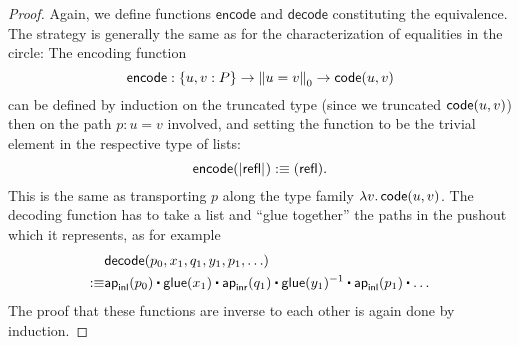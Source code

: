 \begin{proof}
Again, we define functions $\mathsf{encode}$ and $\mathsf{decode}$ constituting
the equivalence.
The strategy is generally the same as for the characterization of equalities
in the circle:
The encoding function
\begin{equation*}
\mathsf{encode} : \{u, v : P\} \to \trunc{0}{u = v} \to \code(u, v)
\end{equation*}
can be defined by induction on the truncated type (since we truncated $\code(u,v)$)
then on the path $p : u = v$ involved, and setting the function to be the trivial
element in the respective type of lists:
\begin{equation*}
\mathsf{encode}(\tproj{}{\refl}) :\equiv (\refl) \text{.}
\end{equation*}
This is the same as transporting $p$ along the type family $\lambda v.\, \code(u,v)$.
The decoding function has to take a list and ``glue together'' the paths in the
pushout which it represents, as for example
\begin{align*}
 & \mathsf{decode} (p_0, x_1, q_1, y_1, p_1, \ldots) \\
:\equiv & \ap_\inl(p_0) \ct \glue(x_1) \ct \ap_\inr(q_1) \ct \glue(y_1)\inv \ct \ap_\inl(p_1) \ct \ldots
\end{align*}
The proof that these functions are inverse to each other is again done by induction.
\end{proof}











